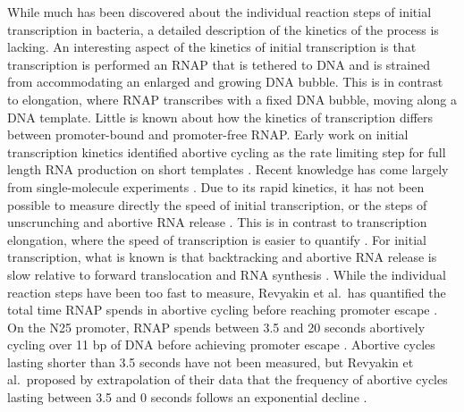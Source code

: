 While much has been discovered about the individual reaction steps of initial
transcription in bacteria, a detailed description of the kinetics of the
process is lacking. An interesting aspect of the kinetics of initial
transcription is that transcription is performed an RNAP that is tethered to
DNA and is strained from accommodating an enlarged and growing DNA bubble.
This is in contrast to elongation, where RNAP transcribes with a fixed DNA
bubble, moving along a DNA template. Little is known about how the kinetics of
transcription differs between promoter-bound and promoter-free RNAP. Early
work on initial transcription kinetics identified abortive cycling as the rate
limiting step for full length RNA production on short templates
\cite{stefano_lac_1979, munson_abortive_1981}. Recent knowledge has come
largely from single-molecule experiments \cite{revyakin_abortive_2006,
kapanidis_initial_2006, tang_real-time_2009, kapanidis_retention_2005,
margeat_direct_2006}. Due to its rapid kinetics, it has not been possible to
measure directly the speed of initial transcription, or the steps of
unscrunching and abortive RNA release \cite{revyakin_abortive_2006,
margeat_direct_2006}. This is in contrast to transcription elongation, where
the speed of transcription is easier to quantify \cite{wang_force_1998,
tolic-norrelykke_diversity_2004, bai_mechanochemical_2007}. For initial
transcription, what is known is that backtracking and abortive RNA release is
slow relative to forward translocation and RNA synthesis
\cite{revyakin_abortive_2006, margeat_direct_2006}. While the individual
reaction steps have been too fast to measure, Revyakin et al.\ has quantified
the total time RNAP spends in abortive cycling before reaching promoter escape
\cite{revyakin_abortive_2006}. On the N25 promoter, RNAP spends between 3.5
and 20 seconds abortively cycling over 11 bp of DNA before achieving promoter
escape \cite{revyakin_abortive_2006}. Abortive cycles lasting shorter than 3.5
seconds have not been measured, but Revyakin et al.\ proposed by extrapolation
of their data that the frequency of abortive cycles lasting between 3.5 and 0
seconds follows an exponential decline \cite{revyakin_abortive_2006}.  

